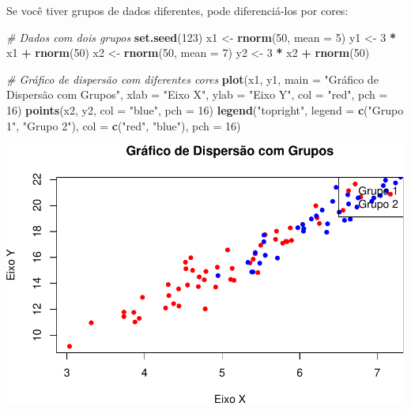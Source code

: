 \documentclass[
]{book}
\newenvironment{Shaded}{\begin{snugshade}}{\end{snugshade}}
\newcommand{\AttributeTok}[1]{\textcolor[rgb]{0.13,0.29,0.53}{#1}}
\newcommand{\CommentTok}[1]{\textcolor[rgb]{0.56,0.35,0.01}{\textit{#1}}}
\newcommand{\DecValTok}[1]{\textcolor[rgb]{0.00,0.00,0.81}{#1}}
\newcommand{\FunctionTok}[1]{\textcolor[rgb]{0.13,0.29,0.53}{\textbf{#1}}}
\newcommand{\NormalTok}[1]{#1}
\newcommand{\OtherTok}[1]{\textcolor[rgb]{0.56,0.35,0.01}{#1}}
\newcommand{\SpecialCharTok}[1]{\textcolor[rgb]{0.81,0.36,0.00}{\textbf{#1}}}
\newcommand{\StringTok}[1]{\textcolor[rgb]{0.31,0.60,0.02}{#1}}
\begin{document}
Se você tiver grupos de dados diferentes, pode diferenciá-los por cores:

\begin{Shaded}
\begin{Highlighting}[]
\CommentTok{\# Dados com dois grupos}
\FunctionTok{set.seed}\NormalTok{(}\DecValTok{123}\NormalTok{)}
\NormalTok{x1 }\OtherTok{\textless{}{-}} \FunctionTok{rnorm}\NormalTok{(}\DecValTok{50}\NormalTok{, }\AttributeTok{mean =} \DecValTok{5}\NormalTok{)}
\NormalTok{y1 }\OtherTok{\textless{}{-}} \DecValTok{3} \SpecialCharTok{*}\NormalTok{ x1 }\SpecialCharTok{+} \FunctionTok{rnorm}\NormalTok{(}\DecValTok{50}\NormalTok{)}
\NormalTok{x2 }\OtherTok{\textless{}{-}} \FunctionTok{rnorm}\NormalTok{(}\DecValTok{50}\NormalTok{, }\AttributeTok{mean =} \DecValTok{7}\NormalTok{)}
\NormalTok{y2 }\OtherTok{\textless{}{-}} \DecValTok{3} \SpecialCharTok{*}\NormalTok{ x2 }\SpecialCharTok{+} \FunctionTok{rnorm}\NormalTok{(}\DecValTok{50}\NormalTok{)}

\CommentTok{\# Gráfico de dispersão com diferentes cores}
\FunctionTok{plot}\NormalTok{(x1, y1, }
     \AttributeTok{main =} \StringTok{"Gráfico de Dispersão com Grupos"}\NormalTok{,}
     \AttributeTok{xlab =} \StringTok{"Eixo X"}\NormalTok{,}
     \AttributeTok{ylab =} \StringTok{"Eixo Y"}\NormalTok{,}
     \AttributeTok{col =} \StringTok{"red"}\NormalTok{, }\AttributeTok{pch =} \DecValTok{16}\NormalTok{)}
\FunctionTok{points}\NormalTok{(x2, y2, }\AttributeTok{col =} \StringTok{"blue"}\NormalTok{, }\AttributeTok{pch =} \DecValTok{16}\NormalTok{)}
\FunctionTok{legend}\NormalTok{(}\StringTok{"topright"}\NormalTok{, }\AttributeTok{legend =} \FunctionTok{c}\NormalTok{(}\StringTok{"Grupo 1"}\NormalTok{, }\StringTok{"Grupo 2"}\NormalTok{), }\AttributeTok{col =} \FunctionTok{c}\NormalTok{(}\StringTok{"red"}\NormalTok{, }\StringTok{"blue"}\NormalTok{), }\AttributeTok{pch =} \DecValTok{16}\NormalTok{)}
\end{Highlighting}
\end{Shaded}

\includegraphics{introR_files/figure-latex/unnamed-chunk-183-1.pdf}
\end{document}
